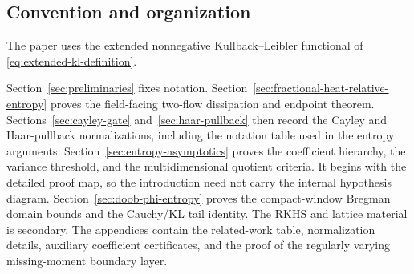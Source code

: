 \subsection*{Convention and organization}

The paper uses the extended nonnegative Kullback--Leibler functional of
\eqref{eq:extended-kl-definition}.

Section~\ref{sec:preliminaries} fixes notation.
Section~\ref{sec:fractional-heat-relative-entropy} proves the field-facing
two-flow dissipation and endpoint theorem.  Sections~\ref{sec:cayley-gate}
and~\ref{sec:haar-pullback} then record the Cayley and Haar-pullback
normalizations, including the notation table used in the entropy arguments.
Section~\ref{sec:entropy-asymptotics} proves the coefficient hierarchy, the
variance threshold, and the multidimensional quotient criteria.  It begins
with the detailed proof map, so the introduction need not carry the internal
hypothesis diagram.  Section~\ref{sec:doob-phi-entropy} proves the
compact-window Bregman domain bounds and the Cauchy/KL tail identity.  The
RKHS and lattice material is secondary.  The appendices contain the
related-work table, normalization details, auxiliary coefficient
certificates, and the proof of the regularly varying missing-moment boundary
layer.
